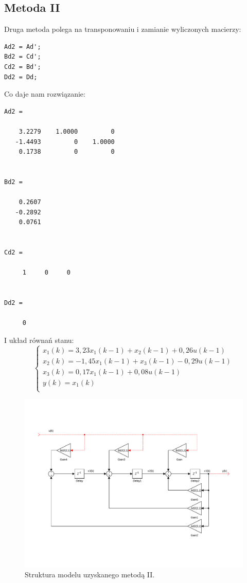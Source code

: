 \subsection{Metoda II}
Druga metoda polega na transponowaniu i zamianie wyliczonych macierzy:
\begin{verbatim}
Ad2 = Ad';
Bd2 = Cd';
Cd2 = Bd';
Dd2 = Dd;
\end{verbatim}
Co daje nam rozwiązanie:
\begin{verbatim}
Ad2 =

    3.2279    1.0000         0
   -1.4493         0    1.0000
    0.1738         0         0


Bd2 =

    0.2607
   -0.2892
    0.0761


Cd2 =

     1     0     0


Dd2 =

     0
\end{verbatim}
I układ równań stanu:
\[
\left\{
\begin{array}{l}
	x_1(k)= 3,23x_1(k-1) + x_2(k-1) + 0,26u(k-1) \\
	x_2(k)= -1,45x_1(k-1) + x_3(k-1) -0,29u(k-1) \\
	x_3(k)= 0,17x_1(k-1) + 0,08u(k-1) \\
	y(k)= x_1(k) \\ 
\end{array}
\right.
\]
\begin{figure}[H]
\centering
 \includegraphics[width=\textwidth]{img/stp2_2.pdf}
\caption{Struktura modelu uzyskanego metodą II.}
\end{figure}



